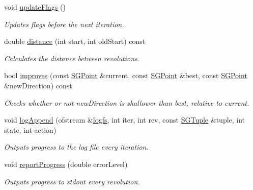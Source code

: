 \begin{DoxyCompactItemize}
void \hyperlink{class_s_g_approximation_a5be5179421280098d416c2d32a44fe35}{update\+Flags} ()
\begin{DoxyCompactList}\small\item\em Updates flags before the next iteration. \end{DoxyCompactList}\item 
double \hyperlink{class_s_g_approximation_a44ce692aa3e9381c0c4522d51145dab8}{distance} (int start, int old\+Start) const 
\begin{DoxyCompactList}\small\item\em Calculates the distance between revolutions. \end{DoxyCompactList}\item 
bool \hyperlink{class_s_g_approximation_a793cc931c160864ef42bdbc47662ace9}{improves} (const \hyperlink{class_s_g_point}{S\+G\+Point} \&current, const \hyperlink{class_s_g_point}{S\+G\+Point} \&best, const \hyperlink{class_s_g_point}{S\+G\+Point} \&new\+Direction) const 
\begin{DoxyCompactList}\small\item\em Checks whether or not new\+Direction is shallower than best, relative to current. \end{DoxyCompactList}\item 
\hypertarget{class_s_g_approximation_abee7788a5c23d632d249bc82f6d0fad4}{void \hyperlink{class_s_g_approximation_abee7788a5c23d632d249bc82f6d0fad4}{log\+Append} (ofstream \&\hyperlink{class_s_g_approximation_a3c938c255cddce7cc0483e223bf09b65}{logfs}, int iter, int rev, const \hyperlink{class_s_g_tuple}{S\+G\+Tuple} \&tuple, int state, int action)}\label{class_s_g_approximation_abee7788a5c23d632d249bc82f6d0fad4}

\begin{DoxyCompactList}\small\item\em Outputs progress to the log file every iteration. \end{DoxyCompactList}\item 
\hypertarget{class_s_g_approximation_a44eb18d812af7613820ac4a18fae20ac}{void \hyperlink{class_s_g_approximation_a44eb18d812af7613820ac4a18fae20ac}{report\+Progress} (double error\+Level)}\label{class_s_g_approximation_a44eb18d812af7613820ac4a18fae20ac}

\begin{DoxyCompactList}\small\item\em Outputs progress to stdout every revolution. \end{DoxyCompactList}\end{DoxyCompactItemize}
